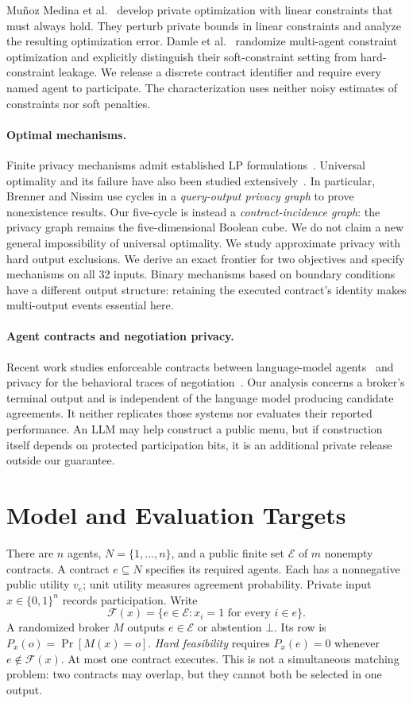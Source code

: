 \documentclass[sigconf,nonacm]{aamas}
\newcommand{\E}{\mathcal E}
\newcommand{\F}{\mathcal F}
\newcommand{\botout}{\bot}
\begin{document}
Mu\~noz Medina et al.~\cite{munoz2021} develop private optimization with linear constraints that must always hold. They perturb private bounds in linear constraints and analyze the resulting optimization error. Damle et al.~\cite{damle2021} randomize multi-agent constraint optimization and explicitly distinguish their soft-constraint setting from hard-constraint leakage. We release a discrete contract identifier and require every named agent to participate. The characterization uses neither noisy estimates of constraints nor soft penalties.

\paragraph{Optimal mechanisms.}
Finite privacy mechanisms admit established LP formulations~\cite{ghosh2012}. Universal optimality and its failure have also been studied extensively~\cite{brenner2010,fernandes2022}. In particular, Brenner and Nissim use cycles in a \emph{query-output privacy graph} to prove nonexistence results. Our five-cycle is instead a \emph{contract-incidence graph}: the privacy graph remains the five-dimensional Boolean cube. We do not claim a new general impossibility of universal optimality. We study approximate privacy with hard output exclusions. We derive an exact frontier for two objectives and specify mechanisms on all 32 inputs. Binary mechanisms based on boundary conditions~\cite{torkamani2023} have a different output structure: retaining the executed contract's identity makes multi-output events essential here.

\paragraph{Agent contracts and negotiation privacy.}
Recent work studies enforceable contracts between language-model agents~\cite{wyse2026} and privacy for the behavioral traces of negotiation~\cite{rani2026}. Our analysis concerns a broker's terminal output and is independent of the language model producing candidate agreements. It neither replicates those systems nor evaluates their reported performance. An LLM may help construct a public menu, but if construction itself depends on protected participation bits, it is an additional private release outside our guarantee.

\section{Model and Evaluation Targets}\label{sec:model}
There are $n$ agents, $N=\{1,\ldots,n\}$, and a public finite set $\E$ of $m$ nonempty contracts. A contract $e\subseteq N$ specifies its required agents. Each has a nonnegative public utility $v_e$; unit utility measures agreement probability. Private input $x\in\{0,1\}^n$ records participation. Write
\[
\F(x)=\{e\in\E:x_i=1\text{ for every }i\in e\}.
\]
A randomized broker $M$ outputs $e\in\E$ or abstention $\botout$. Its row is $P_x(o)=\Pr[M(x)=o]$. \emph{Hard feasibility} requires $P_x(e)=0$ whenever $e\notin\F(x)$. At most one contract executes. This is not a simultaneous matching problem: two contracts may overlap, but they cannot both be selected in one output.
\end{document}
